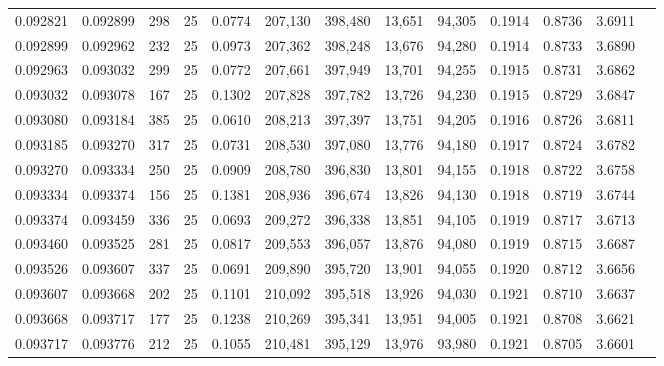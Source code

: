 \begin{tabular}{rrrrrrrrrrrrr}
0.092821 & 0.092899 &   298 &  25 &                                     0.0774 & 207,130 & 398,480 &  13,651 &  94,305 & 0.1914 & 0.8736 & 3.6911 \\
0.092899 & 0.092962 &   232 &  25 &                                     0.0973 & 207,362 & 398,248 &  13,676 &  94,280 & 0.1914 & 0.8733 & 3.6890 \\
0.092963 & 0.093032 &   299 &  25 &                                     0.0772 & 207,661 & 397,949 &  13,701 &  94,255 & 0.1915 & 0.8731 & 3.6862 \\
0.093032 & 0.093078 &   167 &  25 &                                     0.1302 & 207,828 & 397,782 &  13,726 &  94,230 & 0.1915 & 0.8729 & 3.6847 \\
0.093080 & 0.093184 &   385 &  25 &                                     0.0610 & 208,213 & 397,397 &  13,751 &  94,205 & 0.1916 & 0.8726 & 3.6811 \\
0.093185 & 0.093270 &   317 &  25 &                                     0.0731 & 208,530 & 397,080 &  13,776 &  94,180 & 0.1917 & 0.8724 & 3.6782 \\
0.093270 & 0.093334 &   250 &  25 &                                     0.0909 & 208,780 & 396,830 &  13,801 &  94,155 & 0.1918 & 0.8722 & 3.6758 \\
0.093334 & 0.093374 &   156 &  25 &                                     0.1381 & 208,936 & 396,674 &  13,826 &  94,130 & 0.1918 & 0.8719 & 3.6744 \\
0.093374 & 0.093459 &   336 &  25 &                                     0.0693 & 209,272 & 396,338 &  13,851 &  94,105 & 0.1919 & 0.8717 & 3.6713 \\
0.093460 & 0.093525 &   281 &  25 &                                     0.0817 & 209,553 & 396,057 &  13,876 &  94,080 & 0.1919 & 0.8715 & 3.6687 \\
0.093526 & 0.093607 &   337 &  25 &                                     0.0691 & 209,890 & 395,720 &  13,901 &  94,055 & 0.1920 & 0.8712 & 3.6656 \\
0.093607 & 0.093668 &   202 &  25 &                                     0.1101 & 210,092 & 395,518 &  13,926 &  94,030 & 0.1921 & 0.8710 & 3.6637 \\
0.093668 & 0.093717 &   177 &  25 &                                     0.1238 & 210,269 & 395,341 &  13,951 &  94,005 & 0.1921 & 0.8708 & 3.6621 \\
0.093717 & 0.093776 &   212 &  25 &                                     0.1055 & 210,481 & 395,129 &  13,976 &  93,980 & 0.1921 & 0.8705 & 3.6601 \\

\end{tabular}
